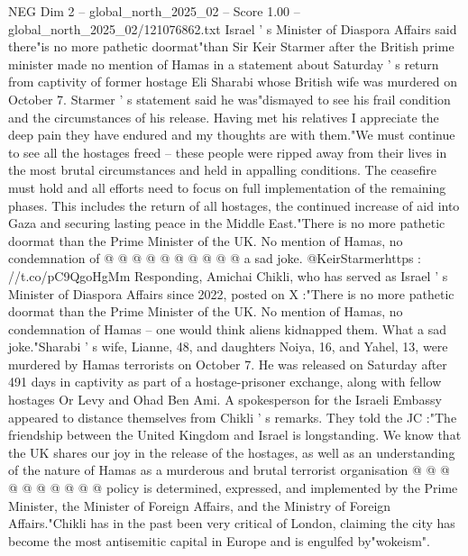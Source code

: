 \begin{textsample}{NEG Dim 2 – global\_north\_2025\_02 – Score 1.00 – global\_north\_2025\_02/121076862.txt}  \label{ex:f2_neg_006}
Israel ' s Minister of Diaspora Affairs said there"is no more pathetic doormat"than Sir Keir Starmer after the British prime minister made no mention of Hamas in a statement about Saturday ' s return from captivity of former hostage Eli Sharabi whose British wife was murdered on October 7.
Starmer ' s statement said he was"dismayed to see his frail condition and the circumstances of his release.
Having met his relatives I appreciate the deep pain they have endured and my thoughts are with them."We must continue to see all the hostages freed -- these people were ripped away from their lives in the most brutal circumstances and held in appalling conditions.
The ceasefire must hold and all efforts need to focus on full implementation of the remaining phases.
This includes the return of all hostages, the continued increase of aid into Gaza and securing lasting peace in the Middle East."There is no more pathetic doormat than the Prime Minister of the UK.
No mention of Hamas, no condemnation of @ @ @ @ @ @ @ @ @ @ a sad joke. @KeirStarmerhttps : //t.co/pC9QgoHgMm Responding, Amichai Chikli, who has served as Israel ' s Minister of Diaspora Affairs since 2022, posted on X :"There is no more pathetic doormat than the Prime Minister of the UK.
No mention of Hamas, no condemnation of Hamas -- one would think aliens kidnapped them.
What a sad joke."Sharabi ' s wife, Lianne, 48, and daughters Noiya, 16, and Yahel, 13, were murdered by Hamas terrorists on October 7.
He was released on Saturday after 491 days in captivity as part of a hostage-prisoner exchange, along with fellow hostages Or Levy and Ohad Ben Ami.
A spokesperson for the Israeli Embassy appeared to distance themselves from Chikli ' s remarks.
They told the JC :"The friendship between the United Kingdom and Israel is longstanding.
We know that the UK shares our joy in the release of the hostages, as well as an understanding of the nature of Hamas as a murderous and brutal terrorist organisation @ @ @ @ @ @ @ @ @ @ policy is determined, expressed, and implemented by the Prime Minister, the Minister of Foreign Affairs, and the Ministry of Foreign Affairs."Chikli has in the past been very critical of London, claiming the city has become the most antisemitic capital in Europe and is engulfed by"wokeism".

\end{textsample}
